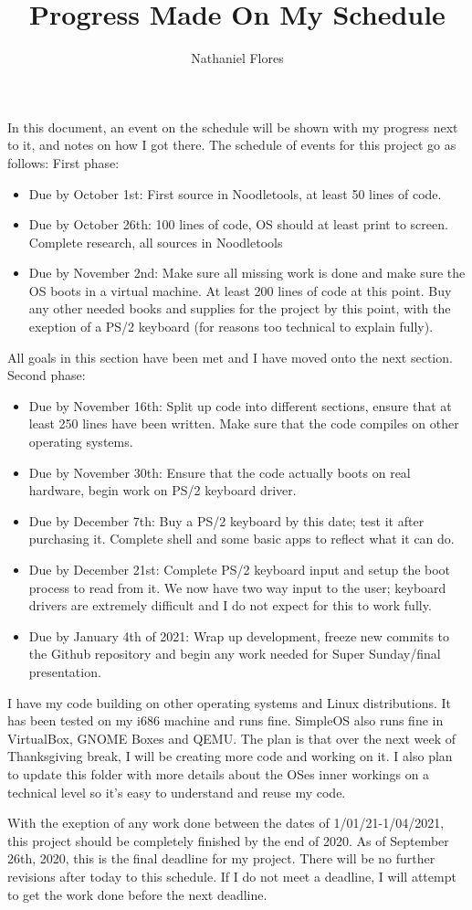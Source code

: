 \documentclass[a4paper,10pt]{article}
\title{Progress Made On My Schedule}
\author{Nathaniel Flores}
\begin{document}
\maketitle
In this document, an event on the schedule will be shown with my progress next to it, and notes on how I got there. The schedule of events for this project go as follows:
\newline
\newline
First phase:
\begin{itemize}
 \item Due by October 1st: First source in Noodletools, at least 50 lines of code.
 \item Due by October 26th: 100 lines of code, OS should at least print to screen. Complete research, all sources in Noodletools
 \item Due by November 2nd: Make sure all missing work is done and make sure the OS boots in a virtual machine. At least 200 lines of code at this point. Buy any other needed books and supplies for the project by this point, with the exeption of a PS/2 keyboard (for reasons too technical to explain fully).
\end{itemize}
All goals in this section have been met and I have moved onto the next section.
Second phase:
\begin{itemize}
 \item Due by November 16th: Split up code into different sections, ensure that at least 250 lines have been written. Make sure that the code compiles on other operating systems.
 \item Due by November 30th: Ensure that the code actually boots on real hardware, begin work on PS/2 keyboard driver.
 \item Due by December 7th: Buy a PS/2 keyboard by this date; test it after purchasing it. Complete shell and some basic apps to reflect what it can do.
 \item Due by December 21st: Complete PS/2 keyboard input and setup the boot process to read from it. We now have two way input to the user; keyboard drivers are extremely difficult and I do not expect for this to work fully.
 \item Due by January 4th of 2021: Wrap up development, freeze new commits to the Github repository and begin any work needed for Super Sunday/final presentation.
\end{itemize}
I have my code building on other operating systems and Linux distributions. It has been tested on my i686 machine and runs fine. SimpleOS also runs fine in VirtualBox, GNOME Boxes and QEMU. The plan is that over the next week of Thanksgiving break, I will be creating more code and working on it. I also plan to update this folder with more details about the OSes inner workings on a technical level so it's easy to understand and reuse my code.

With the exeption of any work done between the dates of 1/01/21-1/04/2021, this project should be completely finished by the end of 2020. As of September 26th, 2020, this is the final deadline for my project. There will be no further revisions after today to this schedule. If I do not meet a deadline, I will attempt to get the work done before the next deadline.
\end{document}
